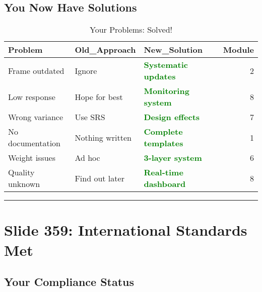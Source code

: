 \documentclass[
]{article}
\begin{document}
\subsection{You Now Have Solutions}\label{you-now-have-solutions}

\begin{longtable}[t]{ll>{}lr}
\caption{\label{tab:challenges-solved}Your Problems: Solved!}\\
\toprule
Problem & Old\_Approach & New\_Solution & Module\\
\midrule
Frame outdated & Ignore & \textcolor{green}{\textbf{Systematic updates}} & 2\\
Low response & Hope for best & \textcolor{green}{\textbf{Monitoring system}} & 8\\
Wrong variance & Use SRS & \textcolor{green}{\textbf{Design effects}} & 7\\
No documentation & Nothing written & \textcolor{green}{\textbf{Complete templates}} & 1\\
Weight issues & Ad hoc & \textcolor{green}{\textbf{3-layer system}} & 6\\
\addlinespace
Quality unknown & Find out later & \textcolor{green}{\textbf{Real-time dashboard}} & 8\\
\bottomrule
\end{longtable}

\begin{center}\rule{0.5\linewidth}{0.5pt}\end{center}

\section{Slide 359: International Standards
Met}\label{slide-359-international-standards-met}

\subsection{Your Compliance Status}\label{your-compliance-status}
\end{document}
